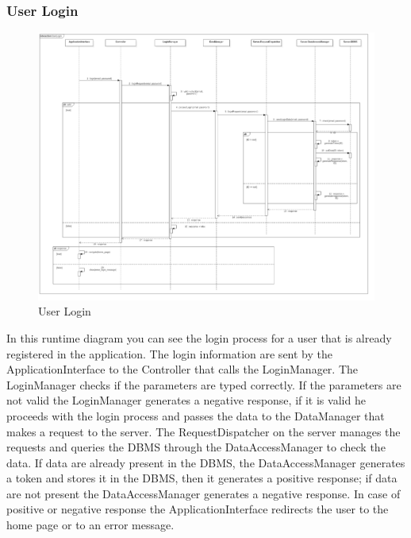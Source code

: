 \subsubsection{User Login}
\begin{figure}[H]
\centering
\includegraphics[scale=0.25]{images/UserLogin}
\caption{User Login}
\end{figure}In this runtime diagram you can see the login process for a user that is already registered in the application. The login information are sent by the ApplicationInterface to the Controller that calls the LoginManager. The LoginManager checks if the parameters are typed correctly. If the parameters are not valid the LoginManager generates a negative response, if it is valid he proceeds with the login process and passes the data to the DataManager that makes a request to the server. The RequestDispatcher on the server manages the requests and queries the DBMS through the DataAccessManager to check the data. If data are already present in the DBMS, the DataAccessManager generates a token and stores it in the DBMS, then it generates a positive response; if data are not present the DataAccessManager generates a negative response. In case of positive or negative response the ApplicationInterface redirects the user to the home page or to an error message.

